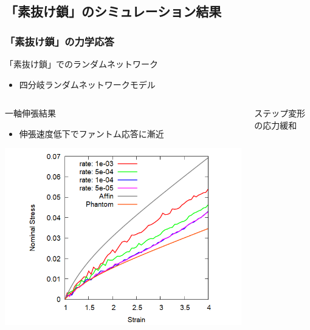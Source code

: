 \documentclass[12pt, dvipdfmx]{beamer}
\begin{document}
\subsection{「素抜け鎖」のシミュレーション結果}
\begin{frame}
	\frametitle{「素抜け鎖」の力学応答}
		\begin{alertblock}{「素抜け鎖」でのランダムネットワーク}
			\begin{itemize}
				\item 四分岐ランダムネットワークモデル
			\end{itemize}
        \end{alertblock}
        \vspace{-3mm}
		\begin{columns}[totalwidth=\linewidth]
				\begin{block}{一軸伸張結果}
					\begin{itemize}
						\item 伸張速度低下で\alert{ファントム応答}に漸近
                    \end{itemize}
                    \begin{center}
                        \includegraphics[width=.9\columnwidth]{N48_sunuke.png}
                    \end{center}
				\end{block}
				\begin{exampleblock}{ステップ変形の応力緩和}
                    \begin{itemize}

\end{itemize}
\end{exampleblock}
\end{columns}
\end{frame}
\end{document}
